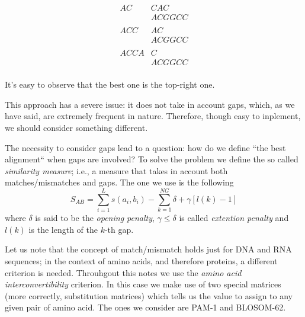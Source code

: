 \documentclass{subfiles}
\begin{document}
\begin{example*}
{\begin{minipage}{0.45\textwidth}
\[\begin{aligned}
                    AC &CAC  \\ 
                    & ACGGCC \\ 
                    \\ 
                    ACC &AC  \\
                    & ACGGCC \\ 
                    \\ 
                    ACCA &C  \\
                    & ACGGCC \\
                \end{aligned}\]
            \end{minipage}}
            
            It's easy to observe that the best one is the top-right one.
        \end{example*}
    This approach has a severe issue: it does not take in account gaps,
        which, as we have said, are extremely frequent in nature. Therefore,
        though easy to inplement, we should consider something different.
    
    The necessity to consider gaps lead to a question: how do we define ``the best alignment``
        when gaps are involved? To solve the problem we define the so called \emph{similarity measure};
        i.e., a measure that takes in account both matches/mismatches and gaps.
        The one we use is the following
        \[
            S_{AB} = \sum_{i = 1}^{L}{s(a_{i}, b_{i})} - \sum_{k = 1}^{NG}{\delta +\gamma[l(k) - 1]}
        \]
        where \(\delta\) is said to be the \emph{opening penalty}, \(\gamma \le \delta\) is 
        called \emph{extention penalty} and \(l(k)\) is the length of the \(k\)-th gap.
    
    Let us note that the concept of match/mismatch holds just for DNA and RNA sequences;
        in the context of amino acids, and therefore proteins, a different criterion is needed. 
        Throuhgout this notes we use the \emph{amino acid interconvertibility} criterion.
        In this case we make use of two special matrices (more correctly, substitution matrices) 
        which tells us the value to assign to any given pair of amino acid. 
        The ones we consider are PAM-1 and BLOSOM-62.
\end{document}
